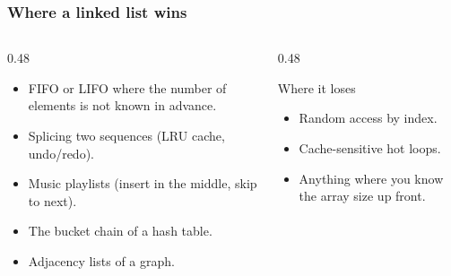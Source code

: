 \documentclass[aspectratio=169,10pt,compress]{beamer}
\begin{document}
\begin{frame}[t,fragile] \frametitle{Where a linked list wins}
  \begin{columns}[T]
    \begin{column}{0.48\textwidth}
      \begin{itemize}\small
        \item FIFO or LIFO where the number of elements is not known
              in advance.
        \item Splicing two sequences (LRU cache, undo/redo).
        \item Music playlists (insert in the middle, skip to next).
        \item The bucket chain of a hash table.
        \item Adjacency lists of a graph.
      \end{itemize}
    \end{column}
    \begin{column}{0.48\textwidth}
      \begin{block}{Where it loses}
        \small
        \begin{itemize}
          \item Random access by index.
          \item Cache-sensitive hot loops.
          \item Anything where you know the array size up front.
        \end{itemize}
      \end{block}
    \end{column}
  \end{columns}
\end{frame}
\end{document}
